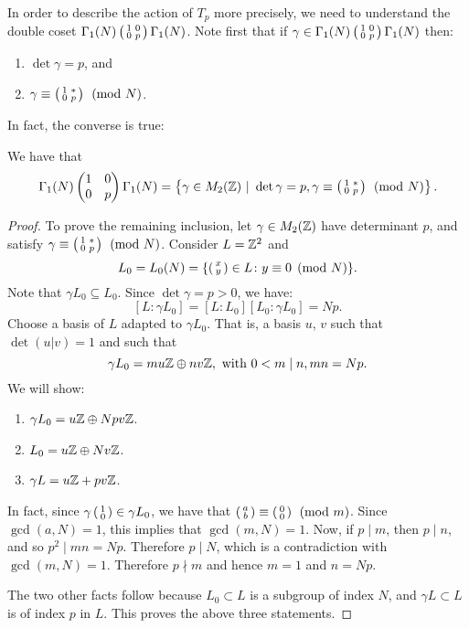 In order to describe the action of $T_p$ more precisely, we need to understand the double coset $\Gamma_1(N)\left(\begin{smallmatrix}1&0\\0&p\end{smallmatrix}\right)\Gamma_1(N)$. Note first that if $\gamma\in \Gamma_1(N)\left(\begin{smallmatrix}1&0\\0&p\end{smallmatrix}\right)\Gamma_1(N)$ then:
\begin{enumerate}
\item $\det \gamma = p$, and
\item $\gamma\equiv\left(\begin{smallmatrix}1&*\\0&p\end{smallmatrix}\right)\pmod N$.
\end{enumerate}
In fact, the converse is true:
\begin{lemma}
  We have that
\[
\Gamma_1(N)\left(\begin{matrix}1&0\\0&p\end{matrix}\right)\Gamma_1(N)=\left\{\gamma\in M_2(\mathbb{Z})~|~\operatorname{det}\gamma = p,\gamma\equiv \left(\begin{smallmatrix}1&*\\0&p\end{smallmatrix}\right)\pmod{N}\right\}.
\]
\end{lemma}
\begin{proof}
To prove the remaining inclusion, let $\gamma\in M_2(\mathbb{Z})$ have determinant $p$, and satisfy  $\gamma\equiv \left(\begin{smallmatrix}1&*\\0&p\end{smallmatrix}\right)\pmod N$. Consider $L=\mathbb{Z}^2$ and
\[
L_0=L_0(N)=\{\left(\begin{smallmatrix}x\\y\end{smallmatrix}\right)\in L\colon y\equiv 0\pmod N\}.
\]
Note that $\gamma L_0\subseteq L_0$. Since $\det \gamma=p>0$, we have:
\[
[L\colon\gamma L_0]=[L\colon L_0][L_0\colon\gamma L_0] = Np.
\]
Choose a basis of $L$ adapted to $\gamma L_0$. That is, a basis $u$, $v$ such that $\det(u|v)=1$ and such that
\[
\gamma L_0=mu\mathbb{Z}\oplus nv\mathbb{Z}, \text{ with } 0<m\mid n, mn=Np.
\]
We will show:
\begin{enumerate}
\item $\gamma L_0=u\mathbb{Z}\oplus Np v\mathbb{Z}$.
\item $L_0 = u\mathbb{Z}\oplus Nv\mathbb{Z}$.
\item $\gamma L = u\mathbb{Z}+pv\mathbb{Z}$.
\end{enumerate}
In fact, since $\gamma\left(\begin{smallmatrix}1\\0\end{smallmatrix}\right)\in \gamma L_0$, we have that $\left(\begin{smallmatrix}a\\b\end{smallmatrix}\right)\equiv\left(\begin{smallmatrix}0\\0\end{smallmatrix}\right)\pmod m$. Since $\gcd(a,N)=1$, this implies that $\gcd(m,N)=1$. Now, if $p\mid m$, then $p\mid n$, and so $p^2\mid mn=Np$. Therefore $p\mid N$, which is a contradiction with $\gcd(m,N)=1$. Therefore $p\nmid m$ and hence $m=1$ and $n=Np$.

The two other facts follow because $L_0\subset L$ is a subgroup of index $N$, and $\gamma L\subset L$ is of index $p$ in $L$. This proves the above three statements.


\end{proof}
